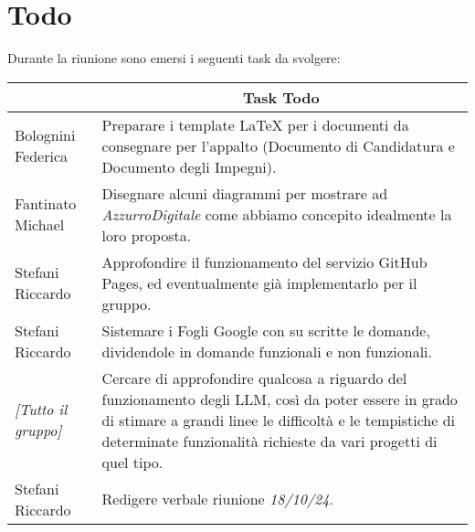 \section{Todo}

Durante la riunione sono emersi i seguenti task da svolgere:

\vspace{0.5cm}

\begin{table}[htbp]
\begin{tabular}{|p{}|p{}|}
    \hline
    \rowcolor[gray]{0.9}
    \multicolumn{1}{|c|}{\textbf{Assegnatario}} & \multicolumn{1}{|c|}{\textbf{Task Todo}} \\
    \hline
    Bolognini Federica & Preparare i template LaTeX per i documenti da consegnare per l'appalto (Documento di Candidatura e Documento degli Impegni). \\
    \hline
    Fantinato Michael & Disegnare alcuni diagrammi per mostrare ad \emph{AzzurroDigitale} come abbiamo concepito idealmente la loro proposta. \\
    \hline
    Stefani Riccardo & Approfondire il funzionamento del servizio GitHub Pages, ed eventualmente già implementarlo per il gruppo. \\
    \hline
    Stefani Riccardo & Sistemare i Fogli Google con su scritte le domande, dividendole in domande funzionali e non funzionali. \\
    \hline
    \emph{[Tutto il gruppo]} & Cercare di approfondire qualcosa a riguardo del funzionamento degli LLM, così da poter essere in grado di stimare a grandi linee le difficoltà e le tempistiche di determinate funzionalità richieste da vari progetti di quel tipo. \\
    \hline
    Stefani Riccardo & Redigere verbale riunione \emph{18/10/24}. \\
    \hline
\end{tabular}
\end{table}
